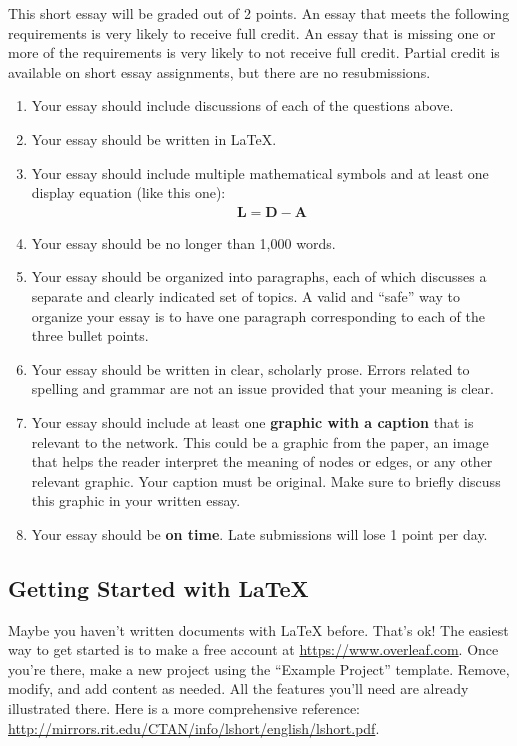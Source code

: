 \documentclass[a4paper, 12pt]{article}
\begin{document}
This short essay will be graded out of 2 points. 
An essay that meets the following requirements is very likely to receive full credit. 
An essay that is missing one or more of the requirements is very likely to not receive full credit. 
Partial credit is available on short essay assignments, but there are no resubmissions.

\begin{enumerate}
    \item Your essay should include discussions of each of the questions above. 
    \item Your essay should be written in \LaTeX{}. 
    \item Your essay should include multiple mathematical symbols and at least one display equation (like this one):
    \begin{align}
        \mathbf{L} = \mathbf{D} - \mathbf{A}
    \end{align}
    \item Your essay should be no longer than 1,000 words.
    \item Your essay should be organized into paragraphs, each of which discusses a separate and clearly indicated set of topics. 
    A valid and ``safe'' way to organize your essay is to have one paragraph corresponding to each of the three bullet points. 
    \item Your essay should be written in clear, scholarly prose. Errors related to spelling and grammar are not an issue provided that your meaning is clear. 
    \item Your essay should include at least one \textbf{graphic with a caption} that is relevant to the network. 
    This could be a graphic from the paper, an image that helps the reader interpret the meaning of nodes or edges, or any other relevant graphic.
    Your caption must be original.  
    Make sure to briefly discuss this graphic in your written essay. 
    \item Your essay should be \textbf{on time}. 
    Late submissions will lose 1 point per day. 
\end{enumerate}


\subsection*{Getting Started with \LaTeX}

Maybe you haven't written documents with \LaTeX{} before. 
That's ok! 
The easiest way to get started is to make a free account at \url{https://www.overleaf.com}. 
Once you're there, make a new project using the ``Example Project'' template.
Remove, modify, and add content as needed. 
All the features you'll need are already illustrated there. 
Here is a more comprehensive reference: 
\url{http://mirrors.rit.edu/CTAN/info/lshort/english/lshort.pdf}. 
\end{document}
